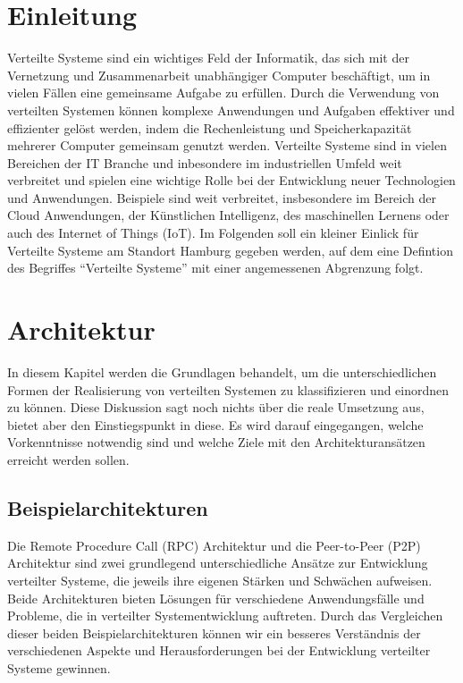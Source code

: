 \documentclass[a4paper]{article}
\begin{document}
\section{Einleitung}
Verteilte Systeme sind ein wichtiges Feld der Informatik, das sich mit der Vernetzung und Zusammenarbeit unabhängiger Computer beschäftigt, um in vielen Fällen eine gemeinsame Aufgabe zu erfüllen. Durch die Verwendung von verteilten Systemen können komplexe Anwendungen und Aufgaben effektiver und effizienter gelöst werden, indem die Rechenleistung und Speicherkapazität mehrerer Computer gemeinsam genutzt werden. Verteilte Systeme sind in vielen Bereichen der IT Branche und inbesondere im industriellen Umfeld weit verbreitet und spielen eine wichtige Rolle bei der Entwicklung neuer Technologien und Anwendungen. Beispiele sind weit verbreitet, insbesondere im Bereich der Cloud Anwendungen, der Künstlichen Intelligenz, des maschinellen Lernens oder auch des Internet of Things (IoT). Im Folgenden soll ein kleiner Einlick für Verteilte Systeme am Standort Hamburg gegeben werden, auf dem eine Defintion des Begriffes \enquote{Verteilte Systeme}  mit einer angemessenen Abgrenzung folgt. 





\newpage
\newpage
\section{Architektur}
In diesem Kapitel werden die Grundlagen behandelt, um die unterschiedlichen Formen der Realisierung von verteilten Systemen zu klassifizieren und einordnen zu können. Diese Diskussion sagt noch nichts über die reale Umsetzung aus, bietet aber den Einstiegspunkt in diese. Es wird darauf eingegangen, welche Vorkenntnisse notwendig sind und welche Ziele mit den Architekturansätzen erreicht werden sollen. 

 




\subsection{Beispielarchitekturen}
Die Remote Procedure Call (RPC) Architektur und die Peer-to-Peer (P2P) Architektur sind zwei grundlegend unterschiedliche Ansätze zur Entwicklung verteilter Systeme, die jeweils ihre eigenen Stärken und Schwächen aufweisen. Beide Architekturen bieten Lösungen für verschiedene Anwendungsfälle und Probleme, die in verteilter Systementwicklung auftreten. Durch das Vergleichen dieser beiden Beispielarchitekturen können wir ein besseres Verständnis der verschiedenen Aspekte und Herausforderungen bei der Entwicklung verteilter Systeme gewinnen.


\end{document}
